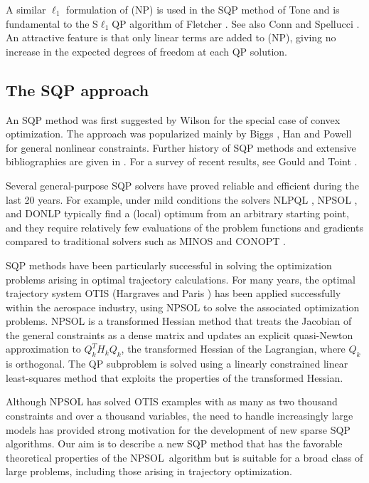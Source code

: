 \documentclass[draft,leqno,onefignum,onetabnum]{siamltex}
\def\CONOPT{{\small CONOPT}}
\def\DONLP {{\small DONLP}}
\def\MINOS {{\small MINOS}}
\def\NLPQL {{\small NLPQL}}
\def\NPSOL {{\small NPSOL}}
\def\OTIS  {{\small OTIS}}
\begin{document}
A similar $\ell_1$ formulation of (NP) is used in the SQP method of Tone
\cite{Ton83} and is fundamental to the S$\ell_1$QP algorithm of
Fletcher \cite{Fle85a}.  See also Conn \cite{Con73} and Spellucci
\cite{Spe98b}.  An attractive feature is that only linear terms are
added to (NP), giving no increase in the expected degrees of freedom at
each QP solution.

\subsection{The SQP approach}

An SQP method was first suggested by Wilson \cite{Wil63} for the
special case of convex optimization.  The approach was popularized
mainly by Biggs \cite{Big72}, Han \cite{Han76} and Powell
\cite{Pow77,Pow78b} for general nonlinear constraints.  Further
history of SQP methods and extensive bibliographies are given in
\cite{GilMW81,Fle87a,Mur97,NocW99,ConGT00a}.  For a survey of recent
results, see Gould and Toint \cite{GouldT99}.

Several general-purpose SQP solvers have proved reliable and efficient
during the last 20 years.  For example, under mild conditions the solvers
\NLPQL{} \cite{Sch85}, \NPSOL{} \cite{GilMSW86a,GilMSW92}, and \DONLP{} \cite{Spe98}
typically find a (local) optimum from an arbitrary starting point,
and they require relatively few evaluations of the problem functions
and gradients compared to traditional solvers such as
\MINOS{} \cite{MurS78,MurS82,MurS98} and \CONOPT{} \cite{Dru85,CONOPT}.

SQP methods have been particularly successful in solving the
optimization problems arising in optimal trajectory calculations.  For
many years, the optimal trajectory system \OTIS{} (Hargraves and Paris
\cite{HP87}) has been applied successfully within the aerospace
industry, using \NPSOL{} to solve the associated optimization
problems.  \NPSOL{} is a transformed Hessian method that treats the
Jacobian of the general constraints as a dense matrix and updates an
explicit quasi-Newton approximation to $Q_k^T H_k Q_k$, the
transformed Hessian of the Lagrangian, where $Q_k$ is orthogonal.  The
QP subproblem is solved using a linearly constrained linear
least-squares method that exploits the properties of the transformed
Hessian.

Although \NPSOL{} has solved \OTIS{} examples with as many as two
thousand constraints and over a thousand variables, the need to handle
increasingly large models has provided strong motivation for the
development of new sparse SQP algorithms.  Our aim is to describe a
new SQP method that has the favorable theoretical properties of the
\NPSOL\ algorithm but is suitable for a broad class of large problems,
including those arising in trajectory optimization.
\end{document}
